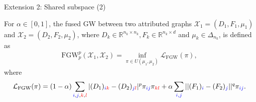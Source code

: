 \documentclass{beamer}
\newcommand{\fgw}{\text{FGW}}
\newcommand{\cX}{\mathcal X}
\newcommand{\cL}{\mathcal L}
\newcommand{\bbR}{\mathbb R}
\begin{document}
\begin{frame}{Extension 2: Shared subspace (2)}
  \scriptsize
  \vspace{-0.7cm}
  \begin{definition}
    For $\alpha \in [0, 1]$, the fused GW between two attributed graphs
    $\cX_1 = (D_1, F_1, \mu_1)$ and $\cX_2 = (D_2, F_2, \mu_2)$,
    where $D_k \in \bbR^{n_k \times n_k}, F_k \in \bbR^{n_k \times d}$
    and $\mu_k \in \Delta_{n_k}$, is defined as
    \begin{align*}
      \fgw_p^p(\cX_1, \cX_2) = \inf_{\pi \in U(\mu_1, \mu_2)} \cL_{\fgw}(\pi),
    \end{align*}
    \vspace{-0.3cm}
    where
    \begin{align*}
      \cL_{\fgw}(\pi) = (1 - \alpha)
      \sum_{{\color{blue}{i}},{\color{blue}{j}},{\color{red}{k}},{\color{red}{l}}}
      |(D_1)_{{\color{blue}{i}} {\color{red}{k}}} - (D_2)_{{\color{blue}{j}}{\color{red}{l}}}|^p \pi_{\color{blue}{{ij}}} \pi_{\color{red}{{kl}}}
      + \alpha \sum_{{\color{blue}{i,j}}} ||(F_1)_{\color{blue}{i}} - (F_2)_{\color{blue}{j}}||^q \pi_{\color{blue}{{ij}}}.
    \end{align*}
  \end{definition}



\end{frame}
\end{document}
